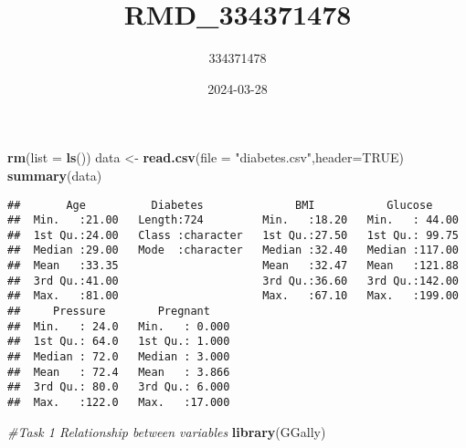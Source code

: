 \documentclass[
]{article}
\title{RMD\_334371478}
\author{334371478}
\date{2024-03-28}
\newenvironment{Shaded}{\begin{snugshade}}{\end{snugshade}}
\newcommand{\AttributeTok}[1]{\textcolor[rgb]{0.13,0.29,0.53}{#1}}
\newcommand{\CommentTok}[1]{\textcolor[rgb]{0.56,0.35,0.01}{\textit{#1}}}
\newcommand{\ConstantTok}[1]{\textcolor[rgb]{0.56,0.35,0.01}{#1}}
\newcommand{\DecValTok}[1]{\textcolor[rgb]{0.00,0.00,0.81}{#1}}
\newcommand{\FunctionTok}[1]{\textcolor[rgb]{0.13,0.29,0.53}{\textbf{#1}}}
\newcommand{\NormalTok}[1]{#1}
\newcommand{\OtherTok}[1]{\textcolor[rgb]{0.56,0.35,0.01}{#1}}
\newcommand{\SpecialCharTok}[1]{\textcolor[rgb]{0.81,0.36,0.00}{\textbf{#1}}}
\newcommand{\StringTok}[1]{\textcolor[rgb]{0.31,0.60,0.02}{#1}}
\begin{document}
\maketitle

\begin{Shaded}
\begin{Highlighting}[]
\FunctionTok{rm}\NormalTok{(}\AttributeTok{list =} \FunctionTok{ls}\NormalTok{())}
\NormalTok{data }\OtherTok{\textless{}{-}} \FunctionTok{read.csv}\NormalTok{(}\AttributeTok{file =} \StringTok{"diabetes.csv"}\NormalTok{,}\AttributeTok{header=}\ConstantTok{TRUE}\NormalTok{)}
\FunctionTok{summary}\NormalTok{(data)}
\end{Highlighting}
\end{Shaded}

\begin{verbatim}
##       Age          Diabetes              BMI           Glucose      
##  Min.   :21.00   Length:724         Min.   :18.20   Min.   : 44.00  
##  1st Qu.:24.00   Class :character   1st Qu.:27.50   1st Qu.: 99.75  
##  Median :29.00   Mode  :character   Median :32.40   Median :117.00  
##  Mean   :33.35                      Mean   :32.47   Mean   :121.88  
##  3rd Qu.:41.00                      3rd Qu.:36.60   3rd Qu.:142.00  
##  Max.   :81.00                      Max.   :67.10   Max.   :199.00  
##     Pressure        Pregnant     
##  Min.   : 24.0   Min.   : 0.000  
##  1st Qu.: 64.0   1st Qu.: 1.000  
##  Median : 72.0   Median : 3.000  
##  Mean   : 72.4   Mean   : 3.866  
##  3rd Qu.: 80.0   3rd Qu.: 6.000  
##  Max.   :122.0   Max.   :17.000
\end{verbatim}

\begin{Shaded}
\end{Shaded}

\begin{Shaded}
\begin{Highlighting}[]
\CommentTok{\#Task 1 Relationship between variables}
\FunctionTok{library}\NormalTok{(GGally)}
\end{Highlighting}
\end{Shaded}
\end{document}
